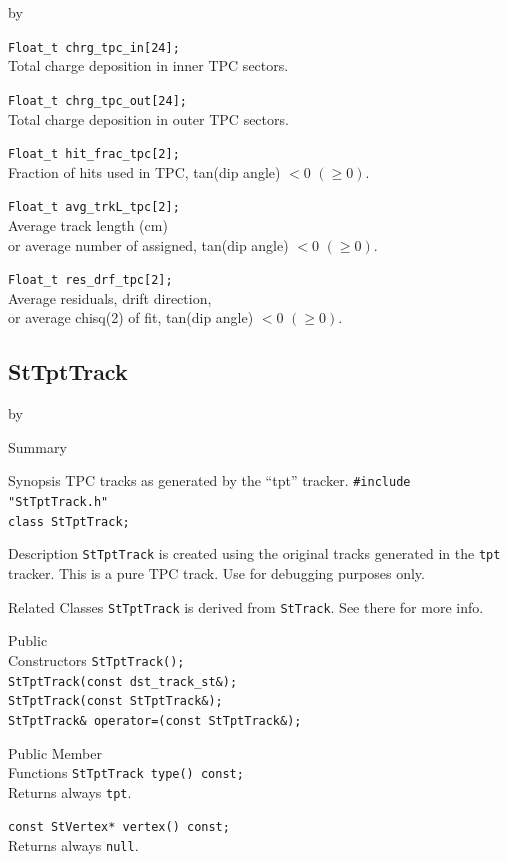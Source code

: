 \documentclass[twoside]{article}
\newcommand{\entrylabel}[1]{\mbox{\textbf{{#1}}}\hfil}%
\newenvironment{entry}
{\begin{list}{}%
    {\renewcommand{\makelabel}{\entrylabel}%
     \setlength{\labelwidth}{90pt}%
     \setlength{\leftmargin}{\labelwidth}
     \advance\leftmargin by \labelsep%
      }%
    }%
  {\end{list}}
\newcommand{\Entrylabel}[1]%
{\raisebox{0pt}[1ex][0pt]{\makebox[\labelwidth][l]%
    {\parbox[t]{\labelwidth}{\hspace{0pt}\textbf{{#1}}}}}}
\newenvironment{Entry}%
{\renewcommand{\entrylabel}{\Entrylabel}\begin{entry}}%
  {\end{entry}}
\begin{document}
\begin{Entry}
    \verb+Float_t chrg_tpc_in[24];+\\
    Total charge deposition in inner TPC sectors.
    
    \verb+Float_t chrg_tpc_out[24];+\\
    Total charge deposition in outer TPC sectors.
    
    \verb+Float_t hit_frac_tpc[2];+\\
    Fraction of hits used in TPC, tan(dip angle) $< 0$ $(\ge 0)$.
    
    \verb+Float_t avg_trkL_tpc[2];+\\
    Average track length (cm) \\ or average number of assigned,
    tan(dip angle) $< 0$ $(\ge 0)$.
    
    \verb+Float_t res_drf_tpc[2];+\\
    Average residuals, drift direction, \\ or average chisq(2) of fit,
    tan(dip angle) $< 0$ $(\ge 0)$.
\end{Entry}
\clearpage

\subsection{StTptTrack}
\label{sec:StTptTrack}
\begin{Entry}
\item[Summary]
\item[Synopsis] TPC tracks as generated by the ``tpt'' tracker.
    \verb+#include "StTptTrack.h"+\\
    \verb+class StTptTrack;+\\
\item[Description] \texttt{StTptTrack} is created using the original
     tracks generated in the \texttt{tpt} tracker. This is a pure TPC track.
     Use for debugging purposes only.

\item[Related Classes] \texttt{StTptTrack} is derived from
    \texttt{StTrack}. See there for more info.
    
\item[Public\\ Constructors]
    \verb+StTptTrack();+\\
    \verb+StTptTrack(const dst_track_st&);+\\
    \verb+StTptTrack(const StTptTrack&);+\\
    \verb+StTptTrack& operator=(const StTptTrack&);+\\
\item[Public Member\\ Functions]
    \verb+StTptTrack type() const;+\\
    Returns always \texttt{tpt}.

    \verb+const StVertex* vertex() const;+\\
    Returns always \texttt{null}.
\end{Entry}
\clearpage
\end{document}
